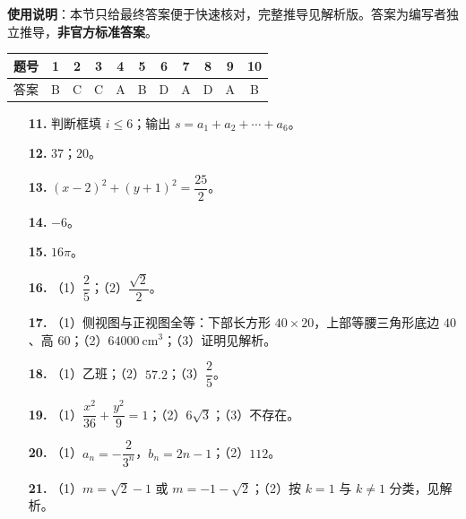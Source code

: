 
\begin{gknotice}
\textbf{使用说明}：本节只给最终答案便于快速核对，完整推导见解析版。答案为编写者独立推导，\textbf{非官方标准答案}。
\end{gknotice}

\begin{center}\begin{tabular}{ccccccccccc}
\toprule
题号 & 1 & 2 & 3 & 4 & 5 & 6 & 7 & 8 & 9 & 10 \\
\midrule
答案 & B & C & C & A & B & D & A & D & A & B \\
\bottomrule
\end{tabular}\end{center}

\begin{itemize}[leftmargin=2.6em]
  \item[\textbf{11.}] 判断框填 $i\leqslant6$；输出 $s=a_1+a_2+\cdots+a_6$。
  \item[\textbf{12.}] $37$；$20$。
  \item[\textbf{13.}] $(x-2)^2+(y+1)^2=\dfrac{25}{2}$。
  \item[\textbf{14.}] $-6$。
  \item[\textbf{15.}] $16\pi$。
\end{itemize}

\begin{itemize}[leftmargin=2.6em]
  \item[\textbf{16.}] （1）$\dfrac25$；（2）$\dfrac{\sqrt2}{2}$。
  \item[\textbf{17.}] （1）侧视图与正视图全等：下部长方形 $40\times20$，上部等腰三角形底边 $40$、高 $60$；（2）$64000\ \mathrm{cm}^3$；（3）证明见解析。
  \item[\textbf{18.}] （1）乙班；（2）$57.2$；（3）$\dfrac25$。
  \item[\textbf{19.}] （1）$\dfrac{x^2}{36}+\dfrac{y^2}{9}=1$；（2）$6\sqrt3$；（3）不存在。
  \item[\textbf{20.}] （1）$a_n=-\dfrac{2}{3^n}$，$b_n=2n-1$；（2）$112$。
  \item[\textbf{21.}] （1）$m=\sqrt2-1$ 或 $m=-1-\sqrt2$；（2）按 $k=1$ 与 $k\neq1$ 分类，见解析。
\end{itemize}
